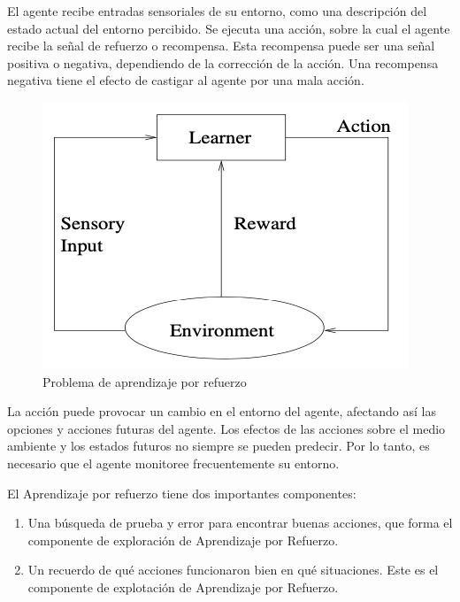 \documentclass[
	11pt, %
]{beamer}
\begin{document}
\begin{frame}

  El agente recibe entradas sensoriales de su entorno, como una descripción del estado actual del entorno percibido. Se ejecuta una acción, sobre la cual el agente recibe la señal de refuerzo o recompensa. Esta recompensa puede ser una señal positiva o negativa, dependiendo de la corrección de la acción. Una recompensa negativa tiene el efecto de castigar al agente por una mala acción.

  \begin{figure}
    \caption{Problema de aprendizaje por refuerzo}
    \includegraphics[width=0.35\linewidth]{rf_bp.png}
  \end{figure}
  
  \bigskip %
  
\end{frame}

\begin{frame}

  La acción puede provocar un cambio en el entorno del agente, afectando así las opciones y acciones futuras del agente. Los efectos de las acciones sobre el medio ambiente y los estados futuros no siempre se pueden predecir. Por lo tanto, es necesario que el agente monitoree frecuentemente su entorno.

  \bigskip %

  El Aprendizaje por refuerzo tiene dos importantes componentes:
  
  \begin{enumerate}
  \item Una búsqueda de prueba y error para encontrar buenas acciones, que forma el componente de exploración de Aprendizaje por Refuerzo.
  \item Un recuerdo de qué acciones funcionaron bien en qué situaciones. Este es el componente de explotación de Aprendizaje por Refuerzo.
  \end{enumerate}
\end{frame}
\end{document}
